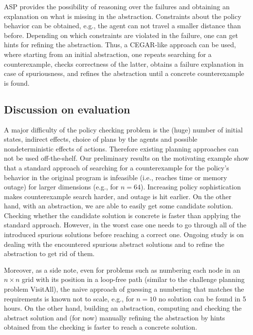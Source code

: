 \documentclass{new_tlp}
\newcommand{\nhbls}{\vspace*{-0.5\baselineskip}}
\begin{document}
ASP provides the possibility of reasoning over the failures and
obtaining an explanation on what is missing in the abstraction. %
Constraints about the policy behavior can be obtained,
e.g., the agent can not travel a smaller distance than
before. Depending on which constraints are violated in the failure,
one can get hints %
for refining the abstraction. 
Thus,
a CEGAR-like approach \cite{clarke03} can be
used, where starting from an
initial abstraction, one repeats searching for a counterexample, checks 
correctness of the latter, obtains a
failure explanation in case of spuriousness, and refines the abstraction
until a concrete counterexample is found.
\nhbls

\subsection{Discussion on evaluation}

A major difficulty of the policy checking problem is the (huge) number
        of initial states, indirect effects, choice of plans by the
        agents and possible nondeterministic effects of
        actions. Therefore existing planning approaches can not be
        used off-the-shelf. Our preliminary results on the motivating
        example show that a standard approach of searching for a
        counterexample for the policy's behavior in the original
        program is infeasible (i.e., reaches time or memory outage) 
        for larger dimensions (e.g., for $n=64$). 
        Increasing policy sophistication makes counterexample search harder, and outage is hit earlier.
		On the other hand, with an abstraction, we are able
        to easily get some candidate solution. Checking whether
        the candidate solution is concrete is faster than applying the standard approach. 
        However, in the worst case one
        needs to go through all of the introduced spurious solutions
        before reaching a correct one. Ongoing study is on dealing
        with the encountered spurious abstract solutions and to refine
        the abstraction to get rid of them.

Moreover, as a side note, even for problems such as numbering each
        node in an $n\times n$ grid with its position in a loop-free
        path (similar to the challenge planning problem VisitAll), the naive
        approach of guessing a numbering that matches the requirements
        is known not to scale, e.g., for $n=10$ no solution can be found
        in 5 hours. On the other hand, building an abstraction,
        computing and checking the abstract
        solution and (for now) manually refining the abstraction by
        hints obtained from the checking is faster to reach a concrete
        solution.
\end{document}
